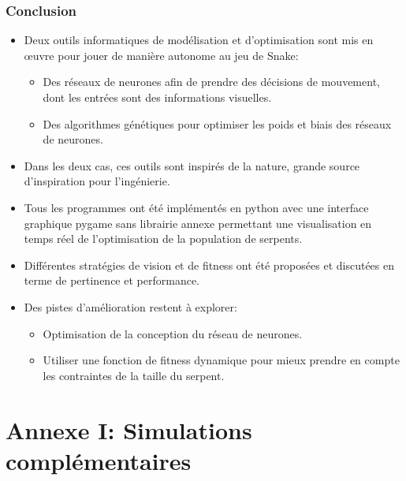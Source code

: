\documentclass[10pt]{beamer}
\begin{document}
\begin{frame}
\frametitle{Conclusion}
\footnotesize
\begin{itemize}
\footnotesize
\item Deux outils informatiques de modélisation et d'optimisation sont mis en \oe{}uvre pour jouer de manière autonome au jeu de Snake:
  \begin{itemize}
  \footnotesize
  \item Des réseaux de neurones afin de prendre des décisions de mouvement, dont les entrées sont des informations visuelles.
  \item Des algorithmes génétiques pour optimiser les poids et biais des réseaux de neurones.
  \end{itemize}
\item Dans les deux cas, ces outils sont inspirés de la nature, grande source d'inspiration pour l'ingénierie.
\item Tous les programmes ont été implémentés en python avec une interface graphique pygame sans librairie annexe permettant une visualisation en temps réel de l'optimisation de la population de serpents.
\item Différentes stratégies de vision et de fitness ont été proposées et discutées en terme de pertinence et performance.
\item Des pistes d'amélioration restent à explorer:
  \begin{itemize}
  \footnotesize
  \item Optimisation de la conception du réseau de neurones.
  \item Utiliser une fonction de fitness dynamique pour mieux prendre en compte les contraintes de la taille du serpent.
  \end{itemize}
\end{itemize}
\end{frame}


\section{Annexe I: \textbf{Simulations complémentaires}}
\end{document}
